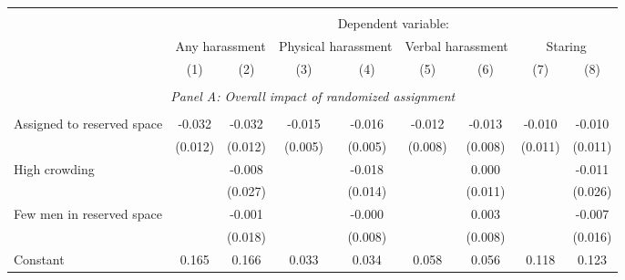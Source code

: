 \begin{tabular}{l*{8}{c}} \hline\hline \\[-1.8ex] & \multicolumn{8}{c}{Dependent variable: } \\ 
                    &\multicolumn{2}{c}{Any harassment}         &\multicolumn{2}{c}{Physical harassment}    &\multicolumn{2}{c}{Verbal harassment}      &\multicolumn{2}{c}{Staring}                \\\cmidrule(lr){2-3}\cmidrule(lr){4-5}\cmidrule(lr){6-7}\cmidrule(lr){8-9}
                    &\multicolumn{1}{c}{(1)}         &\multicolumn{1}{c}{(2)}         &\multicolumn{1}{c}{(3)}         &\multicolumn{1}{c}{(4)}         &\multicolumn{1}{c}{(5)}         &\multicolumn{1}{c}{(6)}         &\multicolumn{1}{c}{(7)}         &\multicolumn{1}{c}{(8)}         \\
 \hline \\[-1ex] \multicolumn{9}{c}{\textit{Panel A: Overall impact of randomized assignment}} \\\\[-1ex]
Assigned to reserved space&      -0.032\sym{**} &      -0.032\sym{**} &      -0.015\sym{***}&      -0.016\sym{***}&      -0.012         &      -0.013         &      -0.010         &      -0.010         \\
                    &     (0.012)         &     (0.012)         &     (0.005)         &     (0.005)         &     (0.008)         &     (0.008)         &     (0.011)         &     (0.011)         \\
[1em]
High crowding       &                     &      -0.008         &                     &      -0.018         &                     &       0.000         &                     &      -0.011         \\
                    &                     &     (0.027)         &                     &     (0.014)         &                     &     (0.011)         &                     &     (0.026)         \\
[1em]
Few men in reserved space&                     &      -0.001         &                     &      -0.000         &                     &       0.003         &                     &      -0.007         \\
                    &                     &     (0.018)         &                     &     (0.008)         &                     &     (0.008)         &                     &     (0.016)         \\
[1em]
Constant            &       0.165\sym{***}&       0.166\sym{***}&       0.033\sym{***}&       0.034\sym{***}&       0.058\sym{***}&       0.056\sym{***}&       0.118\sym{***}&       0.123\sym{***}\\

\end{tabular}
